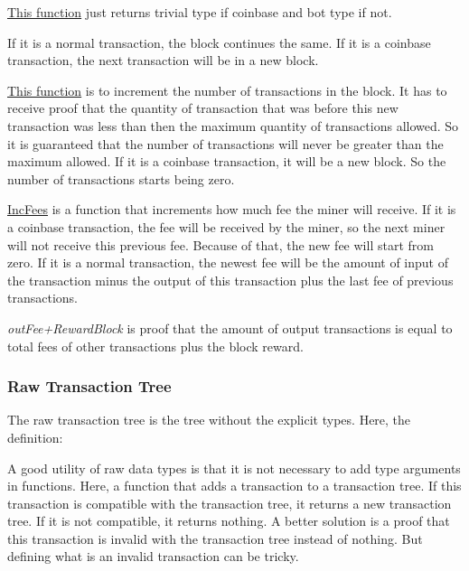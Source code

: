 \label{iscoinbase}

\hyperref[iscoinbase]{This function} just returns trivial type if coinbase and bot type if not.


If it is a normal transaction, the block continues the same.
If it is a coinbase transaction, the next transaction will be in a new block.

\label{incqttx}

\hyperref[incqttx]{This function} is to increment the number of transactions in the block.
It has to receive proof that the quantity of transaction that was before this new transaction was
less than then the maximum quantity of transactions allowed.
So it is guaranteed that the number of transactions will never be greater than the maximum allowed.
If it is a coinbase transaction, it will be a new block.
So the number of transactions starts being zero.

\label{incfees}

\hyperref[incfees]{IncFees} is a function that increments how much fee the miner will receive.
If it is a coinbase transaction, the fee will be received by the miner,
so the next miner will not receive this previous fee.
Because of that, the new fee will start from zero.
If it is a normal transaction, the newest fee will be the amount of input of the transaction minus
the output of this transaction plus the last fee of previous transactions.


\emph{outFee+RewardBlock} is proof that the amount of output transactions is equal to total fees of
other transactions plus the block reward.

\subsubsection{Raw Transaction Tree}

The raw transaction tree is the tree without the explicit types.
Here, the definition:


A good utility of raw data types is that it is not necessary to add type arguments in functions.
Here, a function that adds a transaction to a transaction tree.
If this transaction is compatible with the transaction tree,
it returns a new transaction tree.
If it is not compatible, it returns nothing.
A better solution is a proof that this transaction is invalid with the transaction tree
instead of nothing.
But defining what is an invalid transaction can be tricky.

